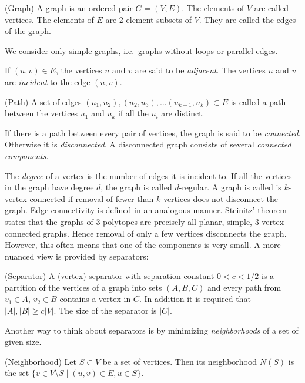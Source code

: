\begin{definition}
(Graph) A graph is an ordered pair $G=(V,E)$. The elements of $V$ are called 
vertices. The elements of $E$ are 2-element subsets of $V$. They are called 
the edges of the graph. 
\end{definition}
We consider only simple graphs, i.e.\ graphs without loops or parallel 
edges.

If $(u,v) \in E$, the vertices $u$ and $v$ are said to be \textit{adjacent}. 
The vertices $u$ and $v$ are \textit{incident} to the edge $(u,v)$. 
\begin{definition}
 (Path) A set of edges $(u_1, u_2), (u_2, u_3), \dots (u_{k-1}, u_k) \subset E$ 
is called a path between the vertices $u_1$ and $u_k$ if all the $u_i$ are 
distinct.
\end{definition}
If there is a path between every pair of vertices, the graph is said to be 
\textit{connected}. Otherwise it is \textit{disconnected}. A disconnected graph 
consists of several \textit{connected components}.

The \textit{degree} of a vertex is the number of edges it is incident to. 
If all the vertices in the graph have degree $d$, the graph is called 
$d$-regular. A graph is called is $k$-vertex-connected if removal of fewer than 
$k$ vertices does not disconnect the graph. Edge connectivity is defined in an 
analogous manner. Steinitz' theorem states that the graphs of 
3-polytopes are precisely all planar, simple, 3-vertex-connected graphs. Hence 
removal of only a few vertices disconnects the graph. However, this
often means that one of the components is very small. A more nuanced view is 
provided 
by separators:

\begin{definition}
(Separator) A (vertex) separator with separation constant $0<c<1/2$ is a 
partition of the vertices of a graph into 
sets $(A,B,C)$ and every path from $v_1 \in A$, $v_2 \in B$ contains a vertex 
in $C$. In addition it is required that $|A|, |B| \geq c|V|$. The size of the 
separator is $|C|$.  
\end{definition}

Another way to think about separators is by minimizing \textit{neighborhoods} 
of a set of given size.

\begin{definition}
 (Neighborhood) Let $S \subset V$ be a set of vertices. Then its neighborhood 
$N(S)$ is the set $\{v \in V\setminus S \mid (u,v) \in E, u \in S\}$. 
\end{definition}

